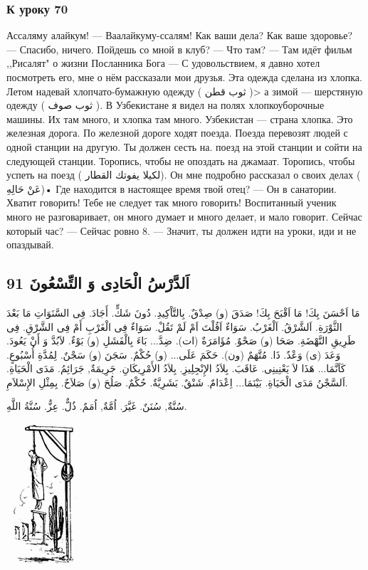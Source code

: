 \documentclass[a5paper]{article}
\begin{document}
\subsubsection{К уроку 70}
Ассаляму алайкум! — Ваалайкуму-ссалям! Как ваши дела? Как ваше здоровье? — Спасибо, ничего. Пойдешь со мной в клуб? — Что там? — Там идёт фильм ,,Рисалят" о жизни Посланника Бога — С удовольствием, я давно хотел посмотреть его, мне о нём рассказали мои друзья. Эта одежда сделана из хлопка. Летом надевай хлопчато-­бумажную одежду ( ثوب قطن )> а зимой — шерстяную одежду ( ثوب صوف ). В Узбекистане я видел на полях хлопкоуборочные машины. Их там много, и хлопка там много. Узбекистан — страна хлопка. Это железная дорога. По железной дороге ходят поезда. Поезда перевозят людей с одной станции на другую. Ты должен сесть на. поезд на этой станции и сойти на следующей станции. Торопись, чтобы не опоздать на джамаат. Торопись, чтобы успеть на поезд ( لكيلا يفوتك القطار). Он мне подробно рассказал о своих делах ( عَنْ حَالِهِ)• Где находится в настоящее время твой отец? — Он в санатории. Хватит говорить! Тебе не следует так много говорить! Воспитанный ученик много не разговаривает, он много думает и много делает, и мало говорит. Сейчас который час? — Сейчас ровно 8. — Значит, ты должен идти на уроки, иди и не опаздывай.

\subsection[اَلدَّرْسُ الْحَادِى وَ التِّسْعُونَ 91]{اَلدَّرْسُ الْحَادِى وَ التِّسْعُونَ 91}
مَا اَحْسَنَ بِكَ! مَا اَقْبَحَ بِكَ! صَدَقَ (و) صِدْقٌ. بِالتَّاْكِيدِ. دُونَ شَكٍّ. أَجَادَ. فِى السَّنَوَاتِ مَا بَعْدَ الثَّوْرَةِ. اَلشَّرْقُ. اَلْغَرْبُ. سَوَاءٌ اَقُلْتَ اَمْ لَمْ تَقُلْ. سَوَاءٌ فِى الْغَرْبِ أَمْ فِى الشَّرْقِ. فِى طَرِيقِ النَّهْضَةِ. صَحَا (و) صَحْوٌ. مُؤَامَرَةٌ (ات). ضِدَّ... بَاءَ بِالْفَشَلِ (و) بَوْءٌ. لاَبُدَّ وَ أَنْ يَعُودَ. وَعَدَ (ى) وَعْدٌ. ذَا. مُتَّهَمٌ (ون). حَكَمَ عَلَى... (و) حُكْمٌ. سَجَنَ (و) سَجْنٌ. لِمُدَّةِ أُسْبُوعٍ. كَاَنَّمَا... هَذَا لاَ يَعْنِينِى. عَاقَبَ. بِلاَدُ الإِنْجِلِيزِ. بِلاَدُ الأَمْرِيكَانِ. جَرِيمَةٌ, جَرَائِمُ. مَدَى الْحَيَاةِ. اَلسَّجْنُ مَدَى الْحَيَاةِ. بَيْنَمَا... اِعْدَامٌ. شَنْقٌ. بَشَرِيَّةٌ. حُكْمٌ. صَلُحَ (و) صَلاَحٌ. بِمِثْلِ الإِسْلاَمِ. 

سُنَّةٌ, سُنَنٌ. غَيَّرَ. اُمَّةٌ, اُمَمٌ. ذُلٌّ. عِزٌّ. سُنَّةُ اللَّهِ. 

\  \includegraphics[width=0.948in,height=2.0626in]{images/MuhammadBagauddinprettified-img254.png} 
\end{document}

